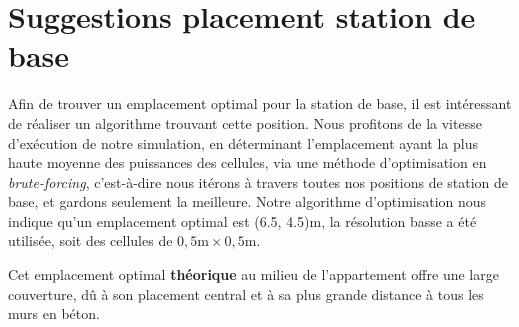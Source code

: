 \section{Suggestions placement station de base}

Afin de trouver un emplacement optimal pour la station de base, il est intéressant de réaliser un algorithme trouvant cette position. Nous profitons de la vitesse d'exécution de notre simulation, en déterminant l'emplacement ayant la plus haute moyenne des puissances des cellules, via une méthode d'optimisation en \textit{brute-forcing}, c'est-à-dire nous itérons à travers toutes nos positions de station de base, et gardons seulement la meilleure. Notre algorithme d'optimisation nous indique qu'un emplacement optimal est (6.5, 4.5)m, la résolution basse a été utilisée, soit des cellules de $0,5\mathrm{m}\times0,5\mathrm{m}$.

Cet emplacement optimal \textbf{théorique} au milieu de l'appartement offre une large couverture, dû à son placement central et à sa plus grande distance à tous les murs en béton.


